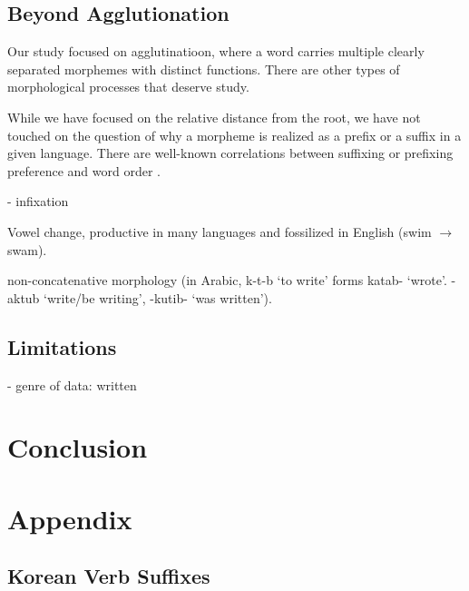 \documentclass[11pt,letterpaper]{article}
\begin{document}
\subsection{Beyond Agglutionation}

Our study focused on agglutinatioon, where a word carries multiple clearly separated morphemes with distinct functions.
There are other types of morphological processes that deserve study.

While we have focused on the relative distance from the root, we have not touched on the question of why a morpheme is realized as a prefix or a suffix in a given language.
There are well-known correlations between suffixing or prefixing preference and word order \citep{greenberg1963universals}.

- infixation

Vowel change, productive in many languages and fossilized in English (swim $\rightarrow$ swam).

non-concatenative morphology (in Arabic, k-t-b `to write' forms katab- `wrote'. -aktub `write/be writing', -kutib- `was written').

\subsection{Limitations}

- genre of data: written



\section{Conclusion}



\appendix

\section{Appendix}



\subsection{Korean Verb Suffixes}
\end{document}
